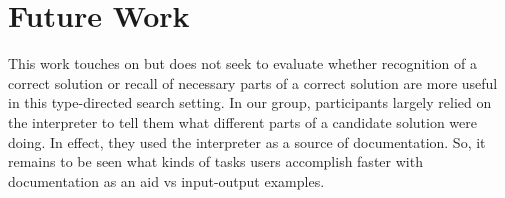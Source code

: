 \section{Future Work}
\label{sec:future}

This work touches on but does not seek to evaluate whether recognition of a
correct solution or recall of necessary parts of a correct solution are more
useful in this type-directed search setting.
%
In our \noexamples group, participants largely relied on the interpreter to tell
them what different parts of a candidate solution were doing.
%
In effect, they used the interpreter as a source of documentation.
%
So, it remains to be seen what kinds of tasks users accomplish faster with
documentation as an aid vs input-output examples.
%
